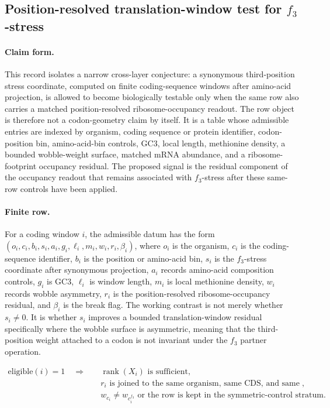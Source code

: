 \subsection{Position-resolved translation-window test for $f_3$-stress}
\label{sec:q6-f3-stress-position-resolved-translation-window-cross-layer}

\paragraph{Claim form.}
This record isolates a narrow cross-layer conjecture: a synonymous third-position stress coordinate, computed on finite coding-sequence windows after amino-acid projection, is allowed to become biologically testable only when the same row also carries a matched position-resolved ribosome-occupancy readout. The row object is therefore not a codon-geometry claim by itself. It is a table whose admissible entries are indexed by organism, coding sequence or protein identifier, codon-position bin, amino-acid-bin controls, GC3, local length, methionine density, a bounded wobble-weight surface, matched mRNA abundance, and a ribosome-footprint occupancy residual. The proposed signal is the residual component of the occupancy readout that remains associated with $f_3$-stress after these same-row controls have been applied.

\paragraph{Finite row.}
For a coding window $i$, the admissible datum has the form $(o_i,c_i,b_i,s_i,a_i,g_i,\ell_i,m_i,w_i,r_i,\beta_i)$, where $o_i$ is the organism, $c_i$ is the coding-sequence identifier, $b_i$ is the position or amino-acid bin, $s_i$ is the $f_3$-stress coordinate after synonymous projection, $a_i$ records amino-acid composition controls, $g_i$ is GC3, $\ell_i$ is window length, $m_i$ is local methionine density, $w_i$ records wobble asymmetry, $r_i$ is the position-resolved ribosome-occupancy residual, and $\beta_i$ is the break flag. The working contrast is not merely whether $s_i \neq 0$. It is whether $s_i$ improves a bounded translation-window residual specifically where the wobble surface is asymmetric, meaning that the third-position weight attached to a codon is not invariant under the $f_3$ partner operation.

$$
\begin{aligned}
\text{eligible}(i) = 1
\quad\Longrightarrow\quad
&\operatorname{rank}(X_i) \text{ is sufficient},\\
&r_i \text{ is joined to the same organism, same CDS, and same window},\\
&w_{c_i} \neq w_{c_i^{f_3}} \text{ or the row is kept in the symmetric-control stratum}.
\end{aligned}
$$

